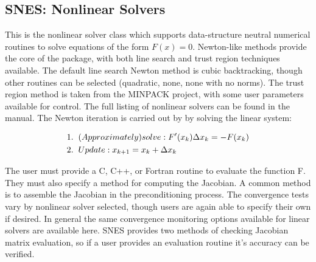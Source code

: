 \documentclass[12pt,twoside]{article}
\begin{document}
\subsection{SNES: Nonlinear Solvers} 
This is the nonlinear solver class which supports data-structure neutral numerical routines to solve equations of the form $F(x)=0$. Newton-like methods provide the core of the package, with both line search and trust region techniques available. The default line search Newton method is cubic backtracking, though other routines can be selected (quadratic, none, none with no norms). The trust region method is taken from the MINPACK project, with some user parameters available for control. The full listing of nonlinear solvers can be found in the manual. The Newton iteration is carried out by by solving the linear system: 

\begin{align*}
&1. \hspace{0.2cm} (Approximately) solve: F'(x_{k})\Delta x_{k} = -F(x_{k}) \\
&2. \hspace{0.2cm}  Update: x_{k+1} = x_{k} + \Delta x_{k}
\end{align*}

The user must provide a C, C++, or Fortran routine to evaluate the function F. They must also specify a method for computing the Jacobian. A common method is to assemble the Jacobian in the preconditioning process. The convergence tests vary by nonlinear solver selected, though users are again able to specify their own if desired. In general the same convergence monitoring options available for linear solvers are available here. SNES provides two methods of checking Jacobian matrix evaluation, so if a user provides an evaluation routine it's accuracy can be verified. 
\end{document}
